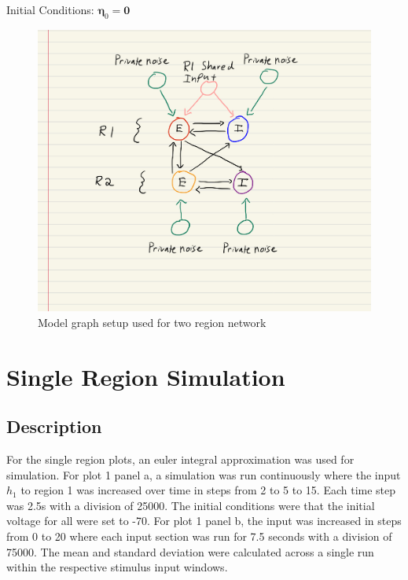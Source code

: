 \documentclass[10pt]{article}
\begin{document}
\hspace*{1cm} Initial Conditions: $\boldsymbol \eta_0 = \boldsymbol 0$
\begin{figure}
    \centering
    \includegraphics[scale=.2]{model.jpg}
    \caption{Model graph setup used for two region network}
\end{figure}
\section{Single Region Simulation}
\subsection{Description}
For the single region plots, an euler integral approximation was used for simulation. For plot 1 panel a, a simulation was run continuously where the input $h_1$ to region 1 was increased over time in steps from 2 to 5 to 15. Each time step was 2.5s with a division of 25000. The initial conditions were that the initial voltage for all were set to -70. For plot 1 panel b, the input was increased in steps from 0 to 20 where each input section was run for 7.5 seconds with a division of 75000. The mean and standard deviation were calculated across a single run within the respective stimulus input windows.
\end{document}
